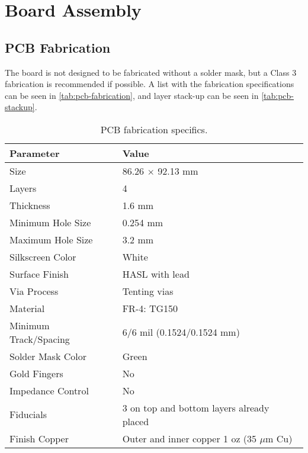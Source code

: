 %
%
%
%
%

%
%
%
%
%
%

\chapter{Board Assembly} \label{ch:assembly}

\section{PCB Fabrication}

The board is not designed to be fabricated without a solder mask, but a Class 3 fabrication is recommended if possible. A list with the fabrication specifications can be seen in \autoref{tab:pcb-fabrication}, and layer stack-up can be seen in \autoref{tab:pcb-stackup}.

\begin{table}[!h]
    \centering
    \begin{tabular}{L{0.5\columnwidth}L{0.5\columnwidth}}
        \toprule[1.5pt]
        \textbf{Parameter}      & \textbf{Value} \\
        \midrule
        Size                    & 86.26 $\times$ 92.13 mm \\
        Layers                  & 4 \\
        Thickness               & 1.6 mm \\
        Minimum Hole Size       & 0.254 mm \\
        Maximum Hole Size       & 3.2 mm \\
        Silkscreen Color        & White \\
        Surface Finish          & HASL with lead \\
        Via Process             & Tenting vias \\
        Material                & FR-4: TG150 \\
        Minimum Track/Spacing   & 6/6 mil (0.1524/0.1524 mm)\\
        Solder Mask Color       & Green \\
        Gold Fingers            & No \\
        Impedance Control       & No \\   
        Fiducials               & 3 on top and bottom layers already placed \\
        Finish Copper           & Outer and inner copper 1 oz (35 $\mu$m Cu) \\
        \bottomrule[1.5pt]
    \end{tabular}
    \caption{PCB fabrication specifics.}
    \label{tab:pcb-fabrication}
\end{table}


